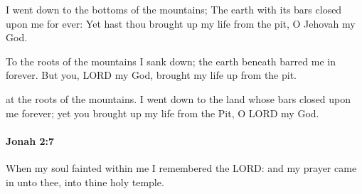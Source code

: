 			\begin{versebox}
					\item[BHS] 
					\item[LXX] 
					\item[ASV] I went down to the bottoms of the mountains; The earth with its bars closed upon me for ever: Yet hast thou brought up my life from the pit, O Jehovah my God.
					\item[NIV] To the roots of the mountains I sank down; the earth beneath barred me in forever. But you, LORD my God, brought my life up from the pit.
					\item[NRSV] at the roots of the mountains. I went down to the land whose bars closed upon me forever; yet you brought up my life from the Pit, O LORD my God.
			\end{versebox}

		\paragraph{Jonah 2:7} %
			\label{JONAH-2-7}

			When my soul fainted within me I remembered the LORD: and my prayer came in unto thee, into thine holy temple.

